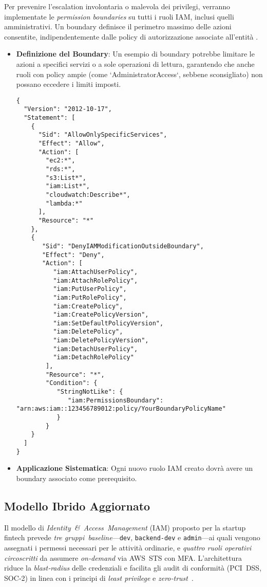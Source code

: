 Per prevenire l'escalation involontaria o malevola dei privilegi, verranno implementate le \emph{permission boundaries} su tutti i ruoli IAM, inclusi quelli amministrativi. Un boundary definisce il perimetro massimo delle azioni consentite, indipendentemente dalle policy di autorizzazione associate all'entità \cite{aws:iam:boundaries}.
\begin{itemize}
    \item \textbf{Definizione del Boundary}: Un esempio di boundary potrebbe limitare le azioni a specifici servizi o a sole operazioni di lettura, garantendo che anche ruoli con policy ampie (come `AdministratorAccess`, sebbene sconsigliato) non possano eccedere i limiti imposti.
    \begin{lstlisting}[style=json, caption={Esempio di Permission Boundary restrittiva}, label=lst:permission-boundary]
{
  "Version": "2012-10-17",
  "Statement": [
    {
      "Sid": "AllowOnlySpecificServices",
      "Effect": "Allow",
      "Action": [
        "ec2:*",
        "rds:*",
        "s3:List*",
        "iam:List*",
        "cloudwatch:Describe*",
        "lambda:*"
      ],
      "Resource": "*"
    },
    {
       "Sid": "DenyIAMModificationOutsideBoundary",
       "Effect": "Deny",
       "Action": [
          "iam:AttachUserPolicy",
          "iam:AttachRolePolicy",
          "iam:PutUserPolicy",
          "iam:PutRolePolicy",
          "iam:CreatePolicy",
          "iam:CreatePolicyVersion",
          "iam:SetDefaultPolicyVersion",
          "iam:DeletePolicy",
          "iam:DeletePolicyVersion",
          "iam:DetachUserPolicy",
          "iam:DetachRolePolicy"
        ],
        "Resource": "*",
        "Condition": {
           "StringNotLike": {
              "iam:PermissionsBoundary": "arn:aws:iam::123456789012:policy/YourBoundaryPolicyName"
           }
        }
    }
  ]
}
    \end{lstlisting}
    \item \textbf{Applicazione Sistematica}: Ogni nuovo ruolo IAM creato dovrà avere un boundary associato come prerequisito.
\end{itemize}

\subsection{Modello Ibrido Aggiornato}
\label{subsec:modello_ibrido_aggiornato}

Il modello di \emph{Identity \& Access Management} (IAM) proposto per la startup fintech prevede \emph{tre gruppi baseline}—\texttt{dev}, \texttt{backend‑dev} e \texttt{admin}—ai quali vengono
assegnati i permessi necessari per le attività ordinarie, e
\emph{quattro ruoli operativi circoscritti} da assumere \emph{on‑demand} via AWS STS con MFA.
L'architettura riduce la \emph{blast‑radius} delle credenziali
e facilita gli audit di conformità (PCI DSS, SOC‑2) in linea con i
principi di \emph{least privilege} e \emph{zero‑trust} \cite{NIST_ZTA,NIST_SP80063,PCI_DSS,DatadogLeastPrivilege}.

